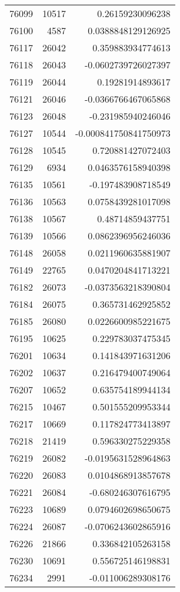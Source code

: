 \begin{tabular}{r | r | r}
76099 & 10517 & 0.26159230096238 \\
76100 & 4587 & 0.0388848129126925 \\
76117 & 26042 & 0.359883934774613 \\
76118 & 26043 & -0.0602739726027397 \\
76119 & 26044 & 0.19281914893617 \\
76121 & 26046 & -0.0366766467065868 \\
76123 & 26048 & -0.231985940246046 \\
76127 & 10544 & -0.000841750841750973 \\
76128 & 10545 & 0.720881427072403 \\
76129 & 6934 & 0.0463576158940398 \\
76135 & 10561 & -0.197483908718549 \\
76136 & 10563 & 0.0758439281017098 \\
76138 & 10567 & 0.48714859437751 \\
76139 & 10566 & 0.0862396956246036 \\
76148 & 26058 & 0.0211960635881907 \\
76149 & 22765 & 0.0470204841713221 \\
76182 & 26073 & -0.0373563218390804 \\
76184 & 26075 & 0.365731462925852 \\
76185 & 26080 & 0.0226600985221675 \\
76195 & 10625 & 0.229783037475345 \\
76201 & 10634 & 0.141843971631206 \\
76202 & 10637 & 0.216479400749064 \\
76207 & 10652 & 0.635754189944134 \\
76215 & 10467 & 0.501555209953344 \\
76217 & 10669 & 0.117824773413897 \\
76218 & 21419 & 0.596330275229358 \\
76219 & 26082 & -0.0195631528964863 \\
76220 & 26083 & 0.0104868913857678 \\
76221 & 26084 & -0.680246307616795 \\
76223 & 10689 & 0.0794602698650675 \\
76224 & 26087 & -0.0706243602865916 \\
76226 & 21866 & 0.336842105263158 \\
76230 & 10691 & 0.556725146198831 \\
76234 & 2991 & -0.011006289308176 \\

\end{tabular}
